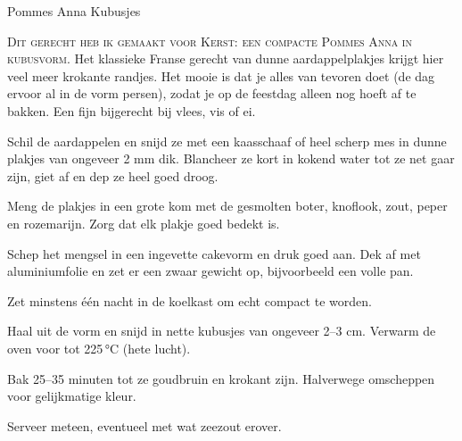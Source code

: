 \begin{recipe}{Pommes Anna Kubusjes}


\lettrine{D}{it gerecht heb ik gemaakt voor Kerst: een compacte Pommes Anna in kubusvorm.} Het klassieke Franse gerecht van dunne aardappelplakjes krijgt hier veel meer krokante randjes. Het mooie is dat je alles van tevoren doet (de dag ervoor al in de vorm persen), zodat je op de feestdag alleen nog hoeft af te bakken. Een fijn bijgerecht bij vlees, vis of ei.

\begin{ingredients}
\end{ingredients}

\begin{steps}
  \item Schil de aardappelen en snijd ze met een kaasschaaf of heel scherp mes in dunne plakjes van ongeveer 2 mm dik. Blancheer ze kort in kokend water tot ze net gaar zijn, giet af en dep ze heel goed droog.
  \item Meng de plakjes in een grote kom met de gesmolten boter, knoflook, zout, peper en rozemarijn. Zorg dat elk plakje goed bedekt is.
  \item Schep het mengsel in een ingevette cakevorm en druk goed aan. Dek af met aluminiumfolie en zet er een zwaar gewicht op, bijvoorbeeld een volle pan.
  \item Zet minstens één nacht in de koelkast om echt compact te worden.
  \item Haal uit de vorm en snijd in nette kubusjes van ongeveer 2--3 cm. Verwarm de oven voor tot 225\,°C (hete lucht).
  \item Bak 25--35 minuten tot ze goudbruin en krokant zijn. Halverwege omscheppen voor gelijkmatige kleur.
  \item Serveer meteen, eventueel met wat zeezout erover.
\end{steps}
\end{recipe}
